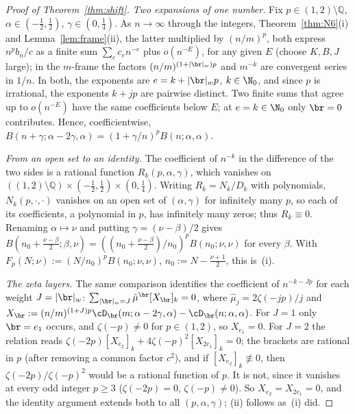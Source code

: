 \begin{proof}[Proof of Theorem~\ref{thm:shift}]
\emph{Two expansions of one number.} Fix $p\in(1,2)\setminus\mathbb Q$, $\alpha\in(-\frac12,\frac12)$, $\gamma\in(0,\frac14)$. As $n\to\infty$
through the integers, Theorem~\ref{thm:N6}(i) and Lemma~\ref{lem:frame}(ii), the latter multiplied by $(n/m)^p$, both express
$n^pb_n/c$ as a finite sum $\sum_ec_en^{-e}$ plus $o(n^{-E})$, for any given $E$ (choose $K,B,J$ large); in the $m$-frame the factors
$(n/m)^{(1+|\br|_w)p}$ and $m^{-k}$ are convergent series in $1/n$. In both, the exponents are $e=k+|\br|_wp$, $k\in\N_0$, and since $p$
is irrational, the exponents $k+jp$ are pairwise distinct. Two finite sums that agree up to $o(n^{-E})$ have the same
coefficients below $E$; at $e=k\in\N_0$ only $\br=0$ contributes. Hence, coefficientwise,
$B(n+\gamma;\alpha-2\gamma,\alpha)=(1+\gamma/n)^pB(n;\alpha,\alpha)$.

\emph{From an open set to an identity.} The coefficient of $n^{-k}$ in the difference of the two sides is a rational function
$R_k(p,\alpha,\gamma)$, which vanishes on $((1,2)\setminus\mathbb Q)\times(-\frac12,\frac12)\times(0,\frac14)$. Writing $R_k=N_k/D_k$ with
polynomials, $N_k(p,\cdot,\cdot)$ vanishes on an open set of $(\alpha,\gamma)$ for infinitely many $p$, so each of its coefficients, a
polynomial in $p$, has infinitely many zeros; thus $R_k\equiv0$. Renaming $\alpha\mapsto\nu$ and putting $\gamma=(\nu-\beta)/2$ gives
$B(n_0+\frac{\nu-\beta}2;\beta,\nu)=((n_0+\frac{\nu-\beta}2)/n_0)^pB(n_0;\nu,\nu)$ for every $\beta$. With
$F_p(N;\nu):=(N/n_0)^pB(n_0;\nu,\nu)$, $n_0:=N-\frac{\nu+1}2$, this is~(i).

\emph{The zeta layers.} The same comparison identifies the coefficient of $n^{-k-Jp}$ for each weight $J=|\br|_w$:
$\sum_{|\br|_w=J}\hat\mu^{\br}[X_{\br}]_k=0$, where $\hat\mu_j=2\zeta(-jp)/j$ and $X_{\br}:=(n/m)^{(1+J)p}\cD_{\br}(m;\alpha-2\gamma,\alpha)-\cD_{\br}(n;\alpha,\alpha)$.
For $J=1$ only $\br=e_1$ occurs, and $\zeta(-p)\ne0$ for $p\in(1,2)$, so $X_{e_1}=0$. For $J=2$ the relation reads
$\zeta(-2p)[X_{e_2}]_k+4\zeta(-p)^2[X_{2e_1}]_k=0$; the brackets are rational in $p$ (after removing a common factor $c^2$), and if
$[X_{e_2}]_k\not\equiv0$, then $\zeta(-2p)/\zeta(-p)^2$ would be a rational function of $p$. It is not, since it vanishes at every odd
integer $p\ge3$ ($\zeta(-2p)=0$, $\zeta(-p)\ne0$). So $X_{e_2}=X_{2e_1}=0$, and the identity argument extends both to all
$(p,\alpha,\gamma)$; (ii) follows as~(i) did.
\end{proof}

